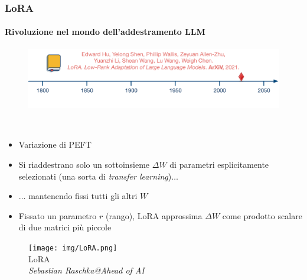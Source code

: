 %
\begin{frame}[t] \frametitle{LoRA}
	{\scriptsize
		\onslide<1->
            \framesubtitle{Rivoluzione nel mondo dell'addestramento LLM}
            \vspace*{-.5cm}
             \begin{minipage}[t]{\textwidth}
             	\begin{figure}[ht]
                    \centering
                    \includegraphics[width=\textwidth]{img/AI-timeline-2021.png}
                \end{figure}
            \end{minipage}
            \\\vspace*{.3cm}
	    	\begin{minipage}[t]{.35\textwidth}
                \begin{itemize}[leftmargin=10pt,align=right]
						\onslide<2->\item[\alert{\faArrowCircleRight}] Variazione di PEFT
						\onslide<3->\item[\alert{\faArrowCircleRight}] Si riaddestrano solo un sottoinsieme $\Delta W$ di parametri esplicitamente selezionati (una sorta di \emph{transfer learning})$\ldots$
						\onslide<4->\item[\alert{\faArrowCircleRight}] $\ldots$ mantenendo fissi tutti gli altri $W$
                        \item[\alert{\faArrowCircleRight}] Fissato un parametro $r$ (\alert{rango}), LoRA approssima $\Delta W$ come prodotto scalare di due matrici più piccole
                \end{itemize}
	    	\end{minipage}
    \hfill
        \begin{minipage}[t]{.60\textwidth}
            \begin{figure}[ht]
                \centering
                \texttt{[image: img/LoRA.png]}
                {\tiny\\LoRA\\\vspace*{-1pt}\textit{\textcopyright Sebastian Raschka@Ahead of AI}}
            \end{figure}
        \end{minipage}
	}
\end{frame}
